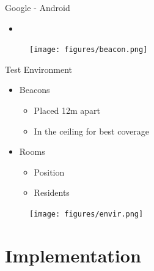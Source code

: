 \documentclass{beamer}
\begin{document}
\begin{frame}[fragile]{Google - Android}
	\begin{minipage}{0.49\textwidth}
		\begin{itemize}
			\item
		\end{itemize}
	\end{minipage}
	\begin{minipage}{0.49\textwidth}
		\begin{figure}
			\texttt{[image: figures/beacon.png]}
		\end{figure}
	\end{minipage}
\end{frame}
\begin{frame}[fragile]{Test Environment}
	\begin{minipage}{0.49\textwidth}
		\begin{itemize}
			\item Beacons
			\begin{itemize}
				\item Placed 12m apart
				\item In the ceiling for best coverage
			\end{itemize}
			\item Rooms
			\begin{itemize}
				\item Position
				\item Residents
			\end{itemize}
		\end{itemize}
	\end{minipage}
	\begin{minipage}{0.49\textwidth}
		\begin{figure}
			\texttt{[image: figures/envir.png]}
		\end{figure}
	\end{minipage}
\end{frame}
\section{Implementation}
\end{document}
